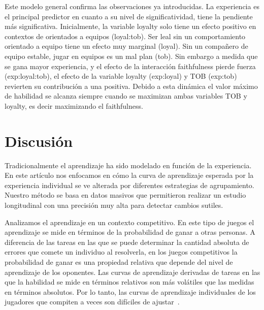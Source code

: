 \documentclass[a4paper,11pt]{book}
\theoremstyle{definition}
\begin{document}
Este modelo general confirma las observaciones ya introducidas.
%
La experiencia es el principal predictor en cuanto a su nivel de significatividad, tiene la pendiente más significativa.
%
Inicialmente, la variable loyalty solo tiene un efecto positivo en contextos de orientados a equipos (loyal:tob).
%
Ser leal sin un comportamiento orientado a equipo tiene un efecto muy marginal (loyal).
%
Sin un compañero de equipo estable, jugar en equipos es un mal plan (tob).
%
Sin embargo a medida que se gana mayor experiencia, y el efecto de la interacción faithfulness pierde fuerza (exp:loyal:tob), el efecto de la variable loyalty (exp:loyal) y TOB (exp:tob) revierten su contribución a una positiva.
%
Debido a esta dinámica el valor máximo de habilidad se alcanza siempre cuando se maximizan ambas variables TOB y loyalty, es decir maximizando el faithfulness.

\section{Discusión}

Tradicionalmente el aprendizaje ha sido modelado en función de la experiencia.
%
En este artículo nos enfocamos en cómo la curva de aprendizaje esperada por la experiencia individual se ve alterada por diferentes estrategias de agrupamiento.
%
Nuestro método se basa en datos masivos que permitieron realizar un estudio longitudinal con una precisión muy alta para detectar cambios sutiles.


Analizamos el aprendizaje en un contexto competitivo.
%
En este tipo de juegos el aprendizaje se mide en términos de la probabilidad de ganar a otras personas.
%
A diferencia de las tareas en las que se puede determinar la cantidad absoluta de errores que comete un individuo al resolverla, en los juegos competitivos la probabilidad de ganar es una propiedad relativa que depende del nivel de aprendizaje de los oponentes.
%
Las curvas de aprendizaje derivadas de tareas en las que la habilidad se mide en términos relativos son más volátiles que las medidas en términos absolutos.
%
Por lo tanto, las curvas de aprendizaje individuales de los jugadores que compiten a veces son difíciles de ajustar~\cite{howard2014-learningCurvesChessPlayersATestOfPowerLawGenerality,gaschler2014-playingOffThePredictedLearningCurve}.

\end{document}
